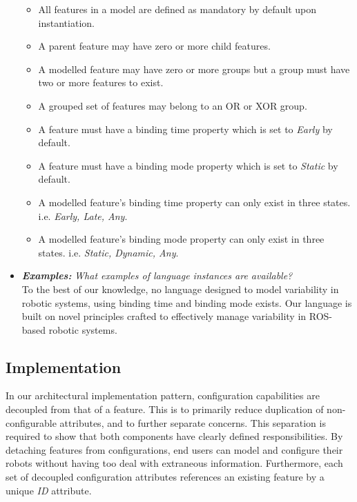\documentclass[conference]{IEEEtran}
\begin{document}
\begin{itemize}
\begin{itemize}
            \item All features in a model are defined as mandatory by default upon instantiation.
            \item A parent feature may have zero or more child features.
            \item A modelled feature may have zero or more groups but a group must have two or more features to exist.
            \item A grouped set of features may belong to an OR or XOR group.
            \item A feature must have a binding time property which is set to \textit{Early} by default.
            \item A feature must have a binding mode property which is set to \textit{Static} by default.
            \item A modelled feature's binding time property can only exist in three states. i.e. \textit{Early, Late, Any}.
            \item A modelled feature's binding mode property can only exist in three states. i.e. \textit{Static, Dynamic, Any}.
        \end{itemize}
        \item \textit{\textbf{Examples:}} \textit{What examples of language instances are available?}\\
        To the best of our knowledge, no language designed to model variability in robotic systems, using binding time and binding mode exists. Our language is built on novel principles crafted to effectively manage variability in ROS-based robotic systems.
    \end{itemize}
    
\subsection{Implementation}
In our architectural implementation pattern, configuration capabilities are decoupled from that of a feature. This is to primarily reduce duplication of non-configurable attributes, and to further separate concerns. This separation is required to show that both components have clearly defined responsibilities. By detaching features from configurations, end users can model and configure their robots without having too deal with extraneous information. Furthermore, each set of decoupled configuration attributes references an existing feature by a unique \textit{ID} attribute.
\end{document}
